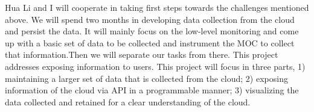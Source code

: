   Hua Li and I will cooperate in taking first steps towards the challenges mentioned above. We will spend two months in developing data collection from the cloud and persist the data. It will mainly focus on the low-level monitoring and come up with a basic set of data to be collected and instrument the MOC to collect that information.Then we will separate our tasks from there. This project addresses exposing information to users. This project will focus in three parts, 1) maintaining a larger set of data that is collected from the cloud; 2) exposing information of the cloud via API in a programmable manner; 3) visualizing the data collected and retained for a clear understanding of the cloud.
